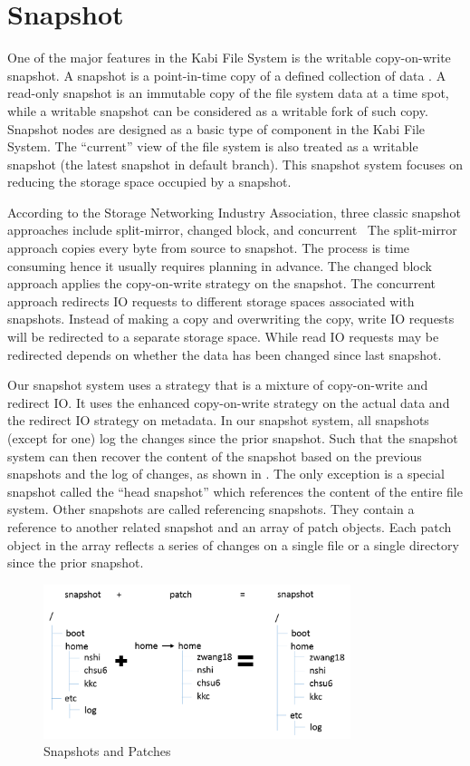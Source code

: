 \chapter{Snapshot}
\label{chap:snapshot}

    One of the major features in the Kabi File System is the writable copy-on-write snapshot. A snapshot is a point-in-time copy of a defined collection of data \cite{snapshot_def}. A read-only snapshot is an immutable copy of the file system data at a time spot, while a writable snapshot can be considered as a writable fork of such copy. Snapshot nodes are designed as a basic type of component in the Kabi File System. The ``current'' view of the file system is also treated as a writable snapshot (the latest snapshot in default branch). This snapshot system focuses on reducing the storage space occupied by a snapshot.

    According to the Storage Networking Industry Association, three classic snapshot approaches include split-mirror, changed block, and concurrent~\cite{snapshot_types} The split-mirror approach copies every byte from source to snapshot. The process is time consuming hence it usually requires planning in advance. The changed block approach applies the copy-on-write strategy on the snapshot. The concurrent approach redirects IO requests to different storage spaces associated with snapshots. Instead of making a copy and overwriting the copy, write IO requests will be redirected to a separate storage space. While read IO requests may be redirected depends on whether the data has been changed since last snapshot.

    Our snapshot system uses a strategy that is a mixture of copy-on-write and redirect IO. It uses the enhanced copy-on-write strategy on the actual data and the redirect IO strategy on metadata. In our snapshot system, all snapshots (except for one) log the changes since the prior snapshot. Such that the snapshot system can then recover the content of the snapshot based on the previous snapshots and the log of changes, as shown in . The only exception is a special snapshot called the ``head snapshot'' which references the content of the entire file system. Other snapshots are called referencing snapshots. They contain a reference to another related snapshot and an array of patch objects. Each patch object in the array reflects a series of changes on a single file or a single directory since the prior snapshot.

\begin{figure}[t]
\centering
\includegraphics[width=0.8\textwidth]{Chapter-4/figs/fig23.png}
\caption{Snapshots and Patches}
\label{fig:snapshot_patch}
\end{figure}

